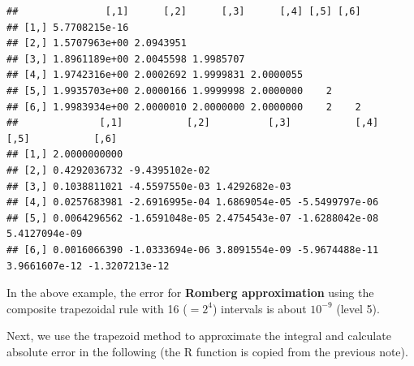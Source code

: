 \documentclass[
]{book}
\begin{document}
\begin{verbatim}
##               [,1]      [,2]      [,3]      [,4] [,5] [,6]
## [1,] 5.7708215e-16                                        
## [2,] 1.5707963e+00 2.0943951                              
## [3,] 1.8961189e+00 2.0045598 1.9985707                    
## [4,] 1.9742316e+00 2.0002692 1.9999831 2.0000055          
## [5,] 1.9935703e+00 2.0000166 1.9999998 2.0000000    2     
## [6,] 1.9983934e+00 2.0000010 2.0000000 2.0000000    2    2
##              [,1]           [,2]          [,3]           [,4]          [,5]           [,6]
## [1,] 2.0000000000                                                                         
## [2,] 0.4292036732 -9.4395102e-02                                                          
## [3,] 0.1038811021 -4.5597550e-03 1.4292682e-03                                            
## [4,] 0.0257683981 -2.6916995e-04 1.6869054e-05 -5.5499797e-06                             
## [5,] 0.0064296562 -1.6591048e-05 2.4754543e-07 -1.6288042e-08 5.4127094e-09               
## [6,] 0.0016066390 -1.0333694e-06 3.8091554e-09 -5.9674488e-11 3.9661607e-12 -1.3207213e-12
\end{verbatim}

In the above example, the error for \textbf{Romberg approximation} using the composite trapezoidal rule with 16 (\(=2^4\)) intervals is about \(10^{-9}\) (level 5).

Next, we use the trapezoid method to approximate the integral and calculate absolute error in the following (the R function is copied from the previous note).
\end{document}
